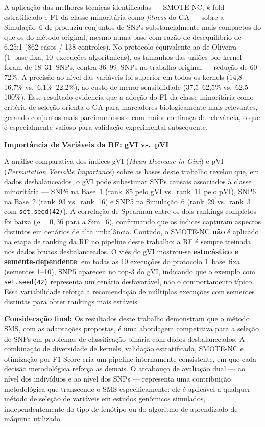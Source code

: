 \documentclass[
    12pt,
    a4paper,
    oneside,
    english,
    french,
    spanish,
    brazil
    ]{abntex2}
\newcommand{\novo}[1]{\textcolor{corNova}{#1}}
\begin{document}
\novo{A aplicação das melhores técnicas identificadas --- SMOTE-NC, $k$-fold estratificado e F1 da classe minoritária como \textit{fitness} do GA --- sobre a Simulação~6 de \citeonline{Oliveira2015} produziu conjuntos de SNPs substancialmente mais compactos do que os do método original, mesmo numa base com razão de desequilíbrio de 6,25:1 (862 casos / 138 controles). No protocolo equivalente ao de Oliveira (1~base fixa, 10~execuções algorítmicas), os tamanhos das uniões por kernel foram de 18--31~SNPs, contra 36--99~SNPs no trabalho original --- redução de 60--72\%. A precisão ao nível das variáveis foi superior em todos os kernels (14,8--16,7\% vs.\ 6,1\%--22,2\%), ao custo de menor sensibilidade (37,5--62,5\% vs.\ 62,5--100\%). Esse resultado evidencia que a adoção do F1 da classe minoritária como critério de seleção orienta o GA para marcadores biologicamente mais relevantes, gerando conjuntos mais parcimoniosos e com maior confiança de relevância, o que é especialmente valioso para validação experimental subsequente.}

\bigskip
\noindent\textbf{Importância de Variáveis da RF: gVI vs.\ pVI}

\novo{A análise comparativa dos índices gVI (\textit{Mean Decrease in Gini}) e pVI (\textit{Permutation Variable Importance}) sobre as bases deste trabalho revelou que, em dados desbalanceados, o gVI pode subestimar SNPs causais associados à classe minoritária --- SNP6 na Base~1 (rank~85 pelo gVI vs.\ rank~11 pelo pVI), SNP6 na Base~2 (rank~93 vs.\ rank~16) e SNP5 na Simulação~6 (rank~29 vs.\ rank~3 com \texttt{set.seed(42)}). A correlação de Spearman entre os dois rankings completos foi baixa ($\rho = 0{,}36$ para a Sim.~6), confirmando que os índices capturam aspectos distintos em cenários de alta imbalância. Contudo, o SMOTE-NC \textbf{não} é aplicado na etapa de ranking da RF no pipeline deste trabalho: a RF é sempre treinada nos dados brutos desbalanceados. O viés do gVI mostrou-se \textbf{estocástico e semente-dependente}: em todas as 10 execuções do protocolo 1~base~fixa (sementes 1--10), SNP5 apareceu no top-3 do gVI, indicando que o exemplo com \texttt{set.seed(42)} representa um cenário desfavorável, não o comportamento típico. Essa variabilidade reforça a recomendação de múltiplas execuções com sementes distintas para obter rankings mais estáveis.}

\bigskip
\noindent\textbf{Consideração final:} \novo{Os resultados deste trabalho demonstram que o método SMS, com as adaptações propostas, é uma abordagem competitiva para a seleção de SNPs em problemas de classificação binária com dados desbalanceados. A combinação de diversidade de kernels, validação estratificada, SMOTE-NC e otimização por F1 Score cria um pipeline internamente consistente, em que cada decisão metodológica reforça as demais. O arcabouço de avaliação dual --- ao nível dos indivíduos e ao nível dos SNPs --- representa uma contribuição metodológica que transcende o SMS especificamente: ele é aplicável a qualquer método de seleção de variáveis em estudos genômicos simulados, independentemente do tipo de fenótipo ou do algoritmo de aprendizado de máquina utilizado.}
\end{document}
